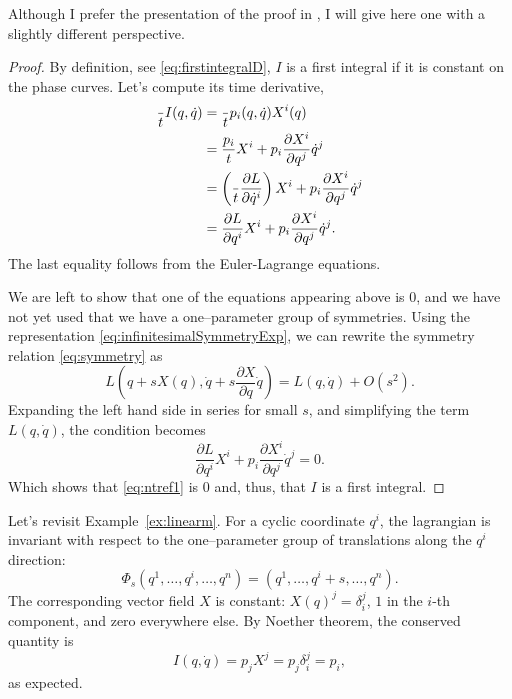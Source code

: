 \documentclass[english,fontsize=11pt,paper=a5,oneside]{scrbook}
\let\d\relax
\DeclareMathOperator{\d}{d}
\theoremstyle{definition}
\newenvironment{example}
  {\pushQED{\qed}\renewcommand{\qedsymbol}{$\lozenge$}\examplex}
  {\popQED\endexamplex}
\begin{document}
Although I prefer the presentation of the proof in \cite[Chapter 20.B]{book:arnold}, I will give here one with a slightly different perspective.
\begin{proof}
    By definition, see \eqref{eq:firstintegralD}, $I$ is a first integral if it is constant on the phase curves.
    Let's compute its time derivative,
    \begin{align}
        \frac{\d}{\d t} I(q, \dot q)
          & = \frac{\d}{\d t} p_i(q, \dot q) X^i(q) \\
          &= \frac{\d p_i}{\d t} X^i + p_i \frac{\partial X^i}{\partial q^j} \dot q^j \\
          &= \left(\frac{\d}{\d t}\frac{\partial L}{\partial \dot q^i}\right) X^i + p_i \frac{\partial X^i}{\partial q^j} \dot q^j \\
          &= \frac{\partial L}{\partial q^i} X^i + p_i \frac{\partial X^i}{\partial q^j} \dot q^j. \label{eq:ntref1}
    \end{align}
    The last equality follows from the Euler-Lagrange equations.
    
    We are left to show that one of the equations appearing above is $0$, and we have not yet used that we have a one--parameter group of symmetries.
    Using the representation \eqref{eq:infinitesimalSymmetryExp}, we can rewrite the symmetry relation \eqref{eq:symmetry} as
    \begin{equation}\label{eq:invariance}
        L\left( q + s X(q), \dot q + s \frac{\partial X}{\partial q} \dot q\right) = L(q, \dot q) + O(s^2).
    \end{equation}
    Expanding the left hand side in series for small $s$, and simplifying the term $L(q, \dot q)$, the condition becomes
    \begin{equation}\label{eq:ntref2}
        \frac{\partial L}{\partial q^i} X^i + p_i \frac{\partial X^i}{\partial q^j} \dot q^j = 0.
    \end{equation}
    Which shows that \eqref{eq:ntref1} is $0$ and, thus, that $I$ is a first integral.
\end{proof}

\begin{example}[kinetic momentum - reprise]\label{exa:kmom}
    Let's revisit Example~\ref{ex:linearm}.
    For a cyclic coordinate $q^i$, the lagrangian is invariant with respect to the one--parameter group of translations along the $q^i$ direction:
    \begin{equation}
        \Phi_s(q^1, \ldots, q^i, \ldots, q^n) = (q^1, \ldots, q^i + s, \ldots, q^n).
    \end{equation}
    The corresponding vector field $X$ is constant: $X(q)^j = \delta^j_i$, $1$ in the $i$-th component, and zero everywhere else.
    By Noether theorem, the conserved quantity is
    \begin{equation}
        I(q,\dot q) = p_j X^j = p_j \delta^j_i = p_i,
    \end{equation}
    as expected.
\end{example}
\end{document}
